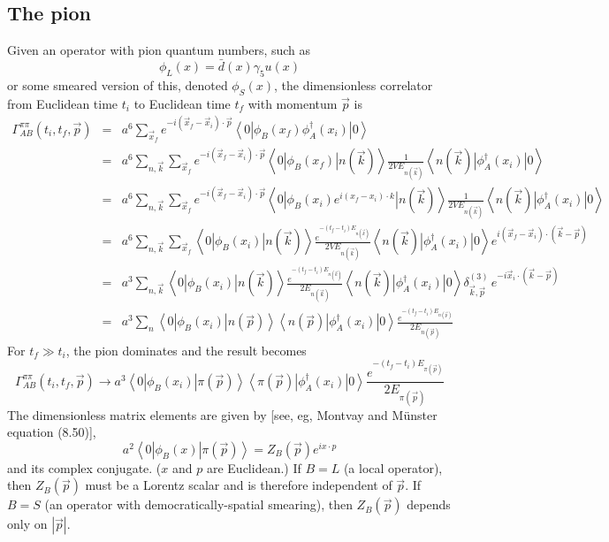 \documentclass[12pt]{article}
\begin{document}
\subsection{The pion}
Given an operator with pion quantum numbers, such as
\[
\phi_L(x) = \bar{d}(x)\gamma_5u(x)
\]
or some smeared version of this, denoted $\phi_S(x)$,
the dimensionless correlator from Euclidean time $t_i$ to Euclidean time $t_f$
with momentum $\vec p$ is
\begin{eqnarray}
\Gamma^{\pi\pi}_{AB}(t_i,t_f,\vec{p})
 &=& a^6\sum_{{\vec x}_f}e^{-i(\vec{x}_f-\vec{x}_i)\cdot\vec{p}}
     \left<0\left|\phi_B(x_f)\phi_A^\dagger(x_i)\right|0\right> \nonumber \\
 &=& a^6\sum_{n,\vec{k}}\sum_{{\vec x}_f}e^{-i(\vec{x}_f-\vec{x}_i)\cdot\vec{p}}
     \left<0\left|\phi_B(x_f)\right|n(\vec{k})\right>
     \frac{1}{2VE_{n(\vec{k})}}
     \left<n(\vec{k})\left|\phi_A^\dagger(x_i)\right|0\right> \nonumber \\
 &=& a^6\sum_{n,\vec{k}}\sum_{{\vec x}_f}e^{-i(\vec{x}_f-\vec{x}_i)\cdot\vec{p}}
     \left<0\left|\phi_B(x_i)e^{i(x_f-x_i)\cdot k}\right|n(\vec{k})\right>
     \frac{1}{2VE_{n(\vec{k})}}
     \left<n(\vec{k})\left|\phi_A^\dagger(x_i)\right|0\right> \nonumber \\
 &=& a^6\sum_{n,\vec{k}}\sum_{{\vec x}_f}
     \left<0\left|\phi_B(x_i)\right|n(\vec{k})\right>
     \frac{e^{-(t_f-t_i)E_{n(\vec{k})}}}{2VE_{n(\vec{k})}}
     \left<n(\vec{k})\left|\phi_A^\dagger(x_i)\right|0\right>
     e^{i(\vec{x}_f-\vec{x}_i)\cdot(\vec{k}-\vec{p})} \nonumber \\
 &=& a^3\sum_{n,\vec{k}}\left<0\left|\phi_B(x_i)\right|n(\vec{k})\right>
     \frac{e^{-(t_f-t_i)E_{n(\vec{k})}}}{2E_{n(\vec{k})}}
     \left<n(\vec{k})\left|\phi_A^\dagger(x_i)\right|0\right>
     \delta^{(3)}_{\vec{k},\vec{p}}\,e^{-i\vec{x}_i\cdot(\vec{k}-\vec{p})}
     \nonumber \\
 &=& a^3\sum_n\left<0\left|\phi_B(x_i)\right|n(\vec{p})\right>
     \left<n(\vec{p})\left|\phi_A^\dagger(x_i)\right|0\right>
     \frac{e^{-(t_f-t_i)E_{n(\vec{p})}}}{2E_{n(\vec{p})}} \nonumber
\end{eqnarray}
For $t_f\gg t_i$, the pion dominates and the result becomes
\begin{equation}
\Gamma^{\pi\pi}_{AB}(t_i,t_f,\vec{p}) \to
     a^3\left<0\left|\phi_B(x_i)\right|\pi(\vec{p})\right>
     \left<\pi(\vec{p})\left|\phi_A^\dagger(x_i)\right|0\right>
     \frac{e^{-(t_f-t_i)E_{\pi(\vec{p})}}}{2E_{\pi(\vec{p})}}
\end{equation}
The dimensionless matrix elements are given by
[see, eg, Montvay and M\"unster equation (8.50)],
\[
a^2\left<0\left|\phi_B(x)\right|\pi(\vec{p})\right> 
  = Z_B(\vec{p})e^{ix\cdot p}
\]
and its complex conjugate.  ($x$ and $p$ are Euclidean.)
If $B=L$ (a local operator), then $Z_B(\vec{p})$ must be a Lorentz scalar
and is therefore independent of $\vec{p}$.  If $B=S$ (an operator with
democratically-spatial smearing), then $Z_B(\vec{p})$ depends only on
$|\vec{p}|$.
\end{document}
